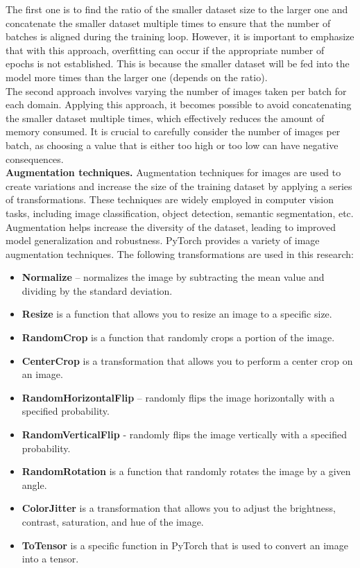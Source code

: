 The first one is to find the ratio of the smaller dataset size to the larger one and concatenate the smaller dataset multiple times to ensure that the number of batches is aligned during the training loop. However, it is important to emphasize that with this approach, overfitting can occur if the appropriate number of epochs is not established. This is because the smaller dataset will be fed into the model more times than the larger one (depends on the ratio).\\

The second approach involves varying the number of images taken per batch for each domain. Applying this approach, it becomes possible to avoid concatenating the smaller dataset multiple times, which effectively reduces the amount of memory consumed. It is crucial to carefully consider the number of images per batch, as choosing a value that is either too high or too low can have negative consequences.\\

\textbf{Augmentation techniques.} Augmentation techniques for images are used to create variations and increase the size of the training dataset by applying a series of transformations. These techniques are widely employed in computer vision tasks, including image classification, object detection, semantic segmentation, etc. Augmentation helps increase the diversity of the dataset, leading to improved model generalization and robustness. PyTorch provides a variety of image augmentation techniques. The following transformations are used in this research:

\begin{itemize}
    \item \textbf{Normalize} -- normalizes the image by subtracting the mean value and dividing by the standard deviation. 
    \item \textbf{Resize} is a function that allows you to resize an image to a specific size.
    \item \textbf{RandomCrop} is a function that randomly crops a portion of the image.
    \item \textbf{CenterCrop} is a transformation that allows you to perform a center crop on an image.
    \item \textbf{RandomHorizontalFlip} -- randomly flips the image horizontally with a specified probability.
    \item \textbf{RandomVerticalFlip} - randomly flips the image vertically with a specified probability.
    \item \textbf{RandomRotation} is a function that randomly rotates the image by a given angle.
    \item \textbf{ColorJitter} is a transformation that allows you to adjust the brightness, contrast, saturation, and hue of the image.
    \item \textbf{ToTensor} is a specific function in PyTorch that is used to convert an image into a tensor.
\end{itemize}

